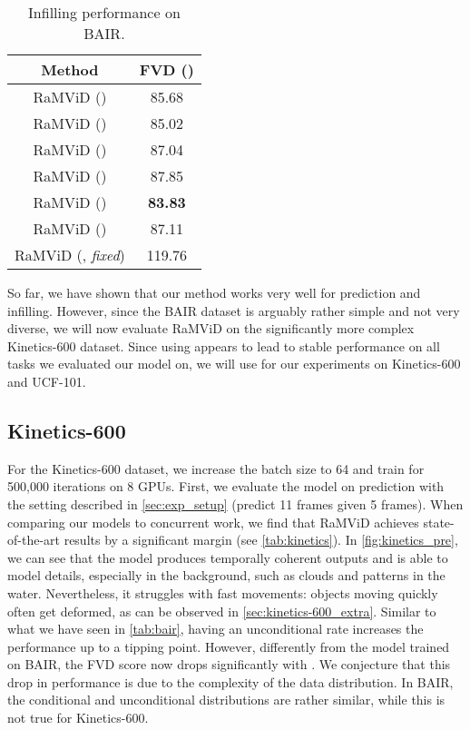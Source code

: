 \documentclass[10pt]{article} \usepackage[accepted]{tmlr}
\begin{document}
\begin{table}
    \centering
    \caption{Infilling performance on BAIR.}
    \begin{tabular}{cc}
        \toprule
        \textbf{Method} &  \textbf{FVD} () \\
        \midrule
        RaMViD () & 85.68 \\
        RaMViD () & 85.02 \\
        RaMViD () & 87.04 \\
        RaMViD () & 87.85 \\
        RaMViD () & \textbf{83.83} \\
        RaMViD () & 87.11 \\
        RaMViD (, \emph{fixed}) & 119.76 \\
        \bottomrule
    \end{tabular}
    \label{tab:bair_infilling}
\end{table}

So far, we have shown that our method works very well for prediction and infilling. However, since the BAIR dataset is arguably rather simple and not very diverse, we will now evaluate RaMViD on the significantly more complex Kinetics-600 dataset. Since using  appears to lead to stable performance on all tasks we evaluated our model on, we will use  for our experiments on Kinetics-600 and UCF-101. 


\subsection{Kinetics-600}

For the Kinetics-600 dataset, we increase the batch size to 64 and train for 500,000 iterations on 8 GPUs. First, we evaluate the model on prediction with the setting described in \cref{sec:exp_setup} (predict 11 frames given 5 frames). When comparing our models to concurrent work, we find that RaMViD achieves state-of-the-art results by a significant margin (see \cref{tab:kinetics}). In \cref{fig:kinetics_pre}, we can see that the model produces temporally coherent outputs and is able to model details, especially in the background, such as clouds and patterns in the water. Nevertheless, it struggles with fast movements: objects moving quickly often get deformed, as can be observed in \cref{sec:kinetics-600_extra}. Similar to what we have seen in \cref{tab:bair}, having an unconditional rate  increases the performance up to a tipping point. However, differently from the model trained on BAIR, the FVD score now drops significantly with . We conjecture that this drop in performance is due to the complexity of the data distribution. In BAIR, the conditional and unconditional distributions are rather similar, while this is not true for Kinetics-600.
\end{document}
